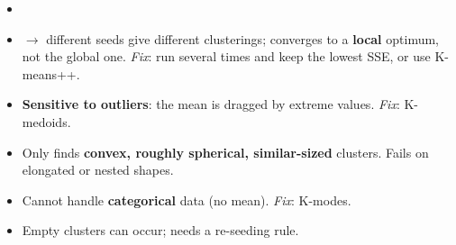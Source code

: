 {
\begin{itemize}
  \item {}
  \item {} $\rightarrow$ different seeds give different
        clusterings; converges to a \textbf{local} optimum, not the global one.
        \emph{Fix}: run several times and keep the lowest SSE, or use K-means++.
  \item \textbf{Sensitive to outliers}: the mean is dragged by extreme values.
        \emph{Fix}: K-medoids.
  \item Only finds \textbf{convex, roughly spherical, similar-sized} clusters.
        Fails on elongated or nested shapes.
  \item Cannot handle \textbf{categorical} data (no mean). \emph{Fix}: K-modes.
  \item Empty clusters can occur; needs a re-seeding rule.
\end{itemize}}

